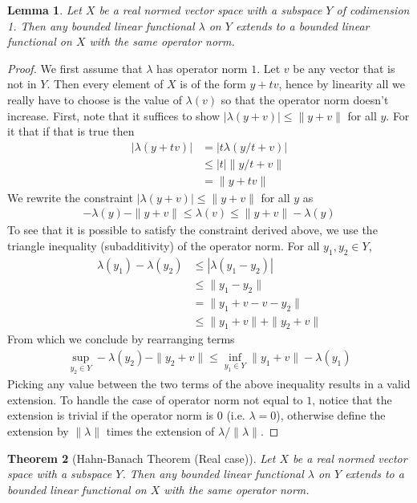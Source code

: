 \documentclass{amsart}
\newtheorem{thm}{Theorem}[section]
\newtheorem{lem}[thm]{Lemma}
\theoremstyle{remark}
\theoremstyle{definition}
\begin{document}
\begin{lem} Let $X$ be a real normed vector space with a subspace $Y$
  of codimension 1.  Then any bounded linear functional $\lambda$ on
  $Y$ extends to a bounded linear functional on $X$ with the same
  operator norm.
\end{lem}
\begin {proof}
We first assume that $\lambda$ has operator norm $1$.
Let $v$ be any vector that is not in $Y$.  Then every element of $X$
is of the form $y + tv$, hence by linearity all we really have to
choose is the value of $\lambda(v)$ so that the operator norm doesn't
increase.  
First, note that it suffices to show $|\lambda(y+v)| \leq
\|y+v\|$ for all $y$.  For it that if that is true then
\begin{align*}
|\lambda(y + tv)| &= |t\lambda(y/t + v)| \\
&\leq |t| \|y/t + v\| \\
&= \|y + tv\| 
\end{align*}
We rewrite the constraint $|\lambda(y+v)| \leq
\|y+v\|$ for all $y$ as
\begin{align*}
-\lambda(y) - \|y+v\| \leq \lambda(v) \leq  \|y+v\| - \lambda(y)
\end{align*}
To see that it is possible to satisfy the constraint derived above, we
use the triangle inequality (subadditivity) of the operator norm.  For
all $y_1,y_2 \in Y$,
\begin{align*}
\lambda(y_1) - \lambda(y_2) &\leq|\lambda(y_1 - y_2)| \\
&\leq \|y_1 - y_2\| \\
&= \|y_1 + v - v - y_2 \| \\
&\leq \|y_1 + v\| + \|y_2 + v\| 
\end{align*}
From which we conclude by rearranging terms 
\begin{align*}
\sup_{y_2 \in Y} -\lambda(y_2) - \|y_2 + v\| \leq \inf_{y_1 \in Y} \|y_1 + v\| - \lambda(y_1)
\end{align*} 
Picking any value between the two terms of the above inequality
results in a valid extension.
To handle the case of operator norm not equal to $1$, notice that the
extension is trivial if the operator norm is $0$ (i.e. $\lambda=0$), otherwise define the
extension by $\|\lambda\|$ times the extension of $\lambda/\|\lambda\|$.
\end {proof}
\begin{thm}[Hahn-Banach Theorem (Real case)]
Let $X$ be a real normed vector space with a subspace $Y$.  Then any bounded linear functional $\lambda$ on  $Y$ extends to a bounded linear functional on $X$ with the same operator norm.
\end{thm}
\end{document}
